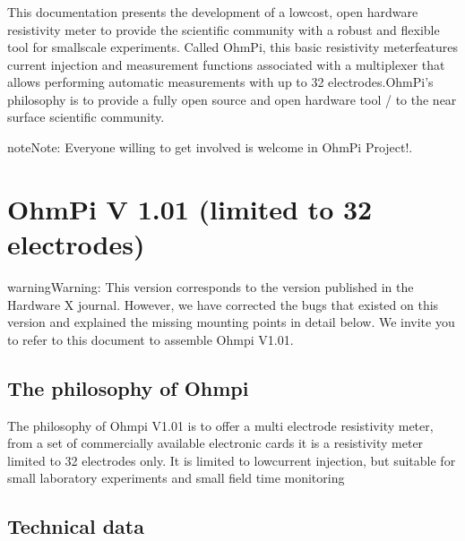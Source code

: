\documentclass[letterpaper,10pt,english]{sphinxmanual}
\begin{document}
\subsection{}
\label{\detokenize{Ohmpi:introduction-to-ohmpi}}
\sphinxAtStartPar
This documentation presents the development of a low\sphinxhyphen{}cost, open hardware resistivity meter to provide the scientific community with a robust and flexible tool for small\sphinxhyphen{}scale experiments. Called OhmPi, this basic resistivity meterfeatures current injection and measurement functions associated with a multiplexer that allows performing automatic measurements with up to 32 electrodes.OhmPi’s philosophy is to provide a fully open source and open hardware tool /
to the near surface scientific community.

\begin{sphinxadmonition}{note}{Note:}
\sphinxAtStartPar
Everyone willing to get involved is  welcome in OhmPi Project!.
\end{sphinxadmonition}


\chapter{OhmPi V 1.01 (limited to 32 electrodes)}
\label{\detokenize{V1_01:ohmpi-v-1-01-limited-to-32-electrodes}}\label{\detokenize{V1_01::doc}}
\begin{sphinxadmonition}{warning}{Warning:}
\sphinxAtStartPar
This version corresponds to the version published in the Hardware X journal.
However, we have corrected the bugs that existed on this version and explained the missing mounting points in detail below.
We invite you to refer to this document to assemble Ohmpi V1.01.
\end{sphinxadmonition}


\section{The philosophy of Ohmpi}
\label{\detokenize{V1_01:the-philosophy-of-ohmpi}}
\sphinxAtStartPar
The philosophy of Ohmpi V1.01 is to offer a multi electrode resistivity meter, from a set of commercially available
electronic cards it is a resistivity meter limited to 32 electrodes only. It is limited to low\sphinxhyphen{}current injection,
but suitable for small laboratory experiments and small field time monitoring


\section{Technical data}
\label{\detokenize{V1_01:technical-data}}
\end{document}
